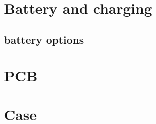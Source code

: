 \section{Battery and charging}
\label{sec:battery}
\subsection{battery options}

\section{PCB}

\section{Case}
